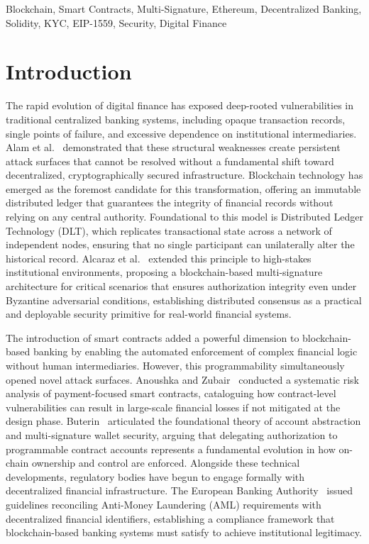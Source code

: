\documentclass[conference]{IEEEtran}
\begin{document}
\begin{IEEEkeywords}
Blockchain, Smart Contracts, Multi-Signature, Ethereum, Decentralized Banking,
Solidity, KYC, EIP-1559, Security, Digital Finance
\end{IEEEkeywords}

\section{Introduction}

The rapid evolution of digital finance has exposed deep-rooted vulnerabilities
in traditional centralized banking systems, including opaque transaction
records, single points of failure, and excessive dependence on institutional
intermediaries. Alam et al.~\cite{ref1} demonstrated that these structural
weaknesses create persistent attack surfaces that cannot be resolved without a
fundamental shift toward decentralized, cryptographically secured
infrastructure. Blockchain technology has emerged as the foremost candidate for
this transformation, offering an immutable distributed ledger that guarantees
the integrity of financial records without relying on any central authority.
Foundational to this model is Distributed Ledger Technology (DLT), which
replicates transactional state across a network of independent nodes, ensuring
that no single participant can unilaterally alter the historical record.
Alcaraz et al.~\cite{ref2} extended this principle to high-stakes institutional
environments, proposing a blockchain-based multi-signature architecture for
critical scenarios that ensures authorization integrity even under Byzantine
adversarial conditions, establishing distributed consensus as a practical and
deployable security primitive for real-world financial systems.

The introduction of smart contracts added a powerful dimension to
blockchain-based banking by enabling the automated enforcement of complex
financial logic without human intermediaries. However, this programmability
simultaneously opened novel attack surfaces. Anoushka and Zubair~\cite{ref3}
conducted a systematic risk analysis of payment-focused smart contracts,
cataloguing how contract-level vulnerabilities can result in large-scale
financial losses if not mitigated at the design phase. Buterin~\cite{ref4}
articulated the foundational theory of account abstraction and multi-signature
wallet security, arguing that delegating authorization to programmable contract
accounts represents a fundamental evolution in how on-chain ownership and
control are enforced. Alongside these technical developments, regulatory bodies
have begun to engage formally with decentralized financial infrastructure. The
European Banking Authority~\cite{ref5} issued guidelines reconciling
Anti-Money Laundering (AML) requirements with decentralized financial
identifiers, establishing a compliance framework that blockchain-based banking
systems must satisfy to achieve institutional legitimacy.
\end{document}
